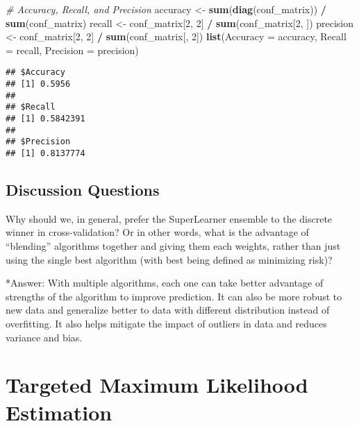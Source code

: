 \documentclass[
]{article}
\newenvironment{Shaded}{\begin{snugshade}}{\end{snugshade}}
\newcommand{\AttributeTok}[1]{\textcolor[rgb]{0.13,0.29,0.53}{#1}}
\newcommand{\CommentTok}[1]{\textcolor[rgb]{0.56,0.35,0.01}{\textit{#1}}}
\newcommand{\DecValTok}[1]{\textcolor[rgb]{0.00,0.00,0.81}{#1}}
\newcommand{\FunctionTok}[1]{\textcolor[rgb]{0.13,0.29,0.53}{\textbf{#1}}}
\newcommand{\NormalTok}[1]{#1}
\newcommand{\OtherTok}[1]{\textcolor[rgb]{0.56,0.35,0.01}{#1}}
\newcommand{\SpecialCharTok}[1]{\textcolor[rgb]{0.81,0.36,0.00}{\textbf{#1}}}
\begin{document}
\begin{Shaded}
\begin{Highlighting}[]
\CommentTok{\# Accuracy, Recall, and Precision}
\NormalTok{accuracy }\OtherTok{\textless{}{-}} \FunctionTok{sum}\NormalTok{(}\FunctionTok{diag}\NormalTok{(conf\_matrix)) }\SpecialCharTok{/} \FunctionTok{sum}\NormalTok{(conf\_matrix)}
\NormalTok{recall }\OtherTok{\textless{}{-}}\NormalTok{ conf\_matrix[}\DecValTok{2}\NormalTok{, }\DecValTok{2}\NormalTok{] }\SpecialCharTok{/} \FunctionTok{sum}\NormalTok{(conf\_matrix[}\DecValTok{2}\NormalTok{, ])}
\NormalTok{precision }\OtherTok{\textless{}{-}}\NormalTok{ conf\_matrix[}\DecValTok{2}\NormalTok{, }\DecValTok{2}\NormalTok{] }\SpecialCharTok{/} \FunctionTok{sum}\NormalTok{(conf\_matrix[, }\DecValTok{2}\NormalTok{])}
\FunctionTok{list}\NormalTok{(}\AttributeTok{Accuracy =}\NormalTok{ accuracy, }\AttributeTok{Recall =}\NormalTok{ recall, }\AttributeTok{Precision =}\NormalTok{ precision)}
\end{Highlighting}
\end{Shaded}

\begin{verbatim}
## $Accuracy
## [1] 0.5956
## 
## $Recall
## [1] 0.5842391
## 
## $Precision
## [1] 0.8137774
\end{verbatim}

\subsection{Discussion Questions}\label{discussion-questions}

Why should we, in general, prefer the SuperLearner ensemble to the
discrete winner in cross-validation? Or in other words, what is the
advantage of ``blending'' algorithms together and giving them each
weights, rather than just using the single best algorithm (with best
being defined as minimizing risk)?

*Answer: With multiple algorithms, each one can take better advantage of
strengths of the algorithm to improve prediction. It can also be more
robust to new data and generalize better to data with different
distribution instead of overfitting. It also helps mitigate the impact
of outliers in data and reduces variance and bias.

\section{Targeted Maximum Likelihood
Estimation}\label{targeted-maximum-likelihood-estimation}
\end{document}
